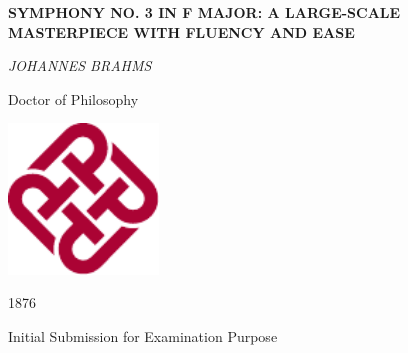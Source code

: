 \thispagestyle{empty}

\begin{center}

\vspace*{2cm}

{\Large \textbf{
SYMPHONY NO. 3 IN F MAJOR: A LARGE-SCALE MASTERPIECE WITH FLUENCY AND EASE
}}

\vspace{2cm}
{\Large \textit{JOHANNES BRAHMS}}

\vspace{2cm}
{\large Doctor of Philosophy}

\vspace{2cm}
\includegraphics[width=0.3\textwidth]{Polyu logo.pdf}


\vspace{2cm}
{\large 1876}

\vspace{1cm}
{\large Initial Submission for Examination Purpose}

\end{center}
